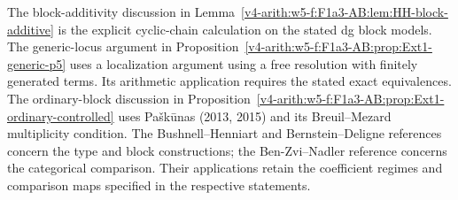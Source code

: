 The block-additivity discussion in
Lemma~\ref{v4-arith:w5-f:F1a3-AB:lem:HH-block-additive} is the
explicit cyclic-chain calculation on the stated dg block models. The generic-locus argument in
Proposition~\ref{v4-arith:w5-f:F1a3-AB:prop:Ext1-generic-p5} uses a localization argument using a free resolution with finitely generated terms.
Its arithmetic application requires the stated exact equivalences. The ordinary-block discussion in
Proposition~\ref{v4-arith:w5-f:F1a3-AB:prop:Ext1-ordinary-controlled}
uses Pa{\v s}k{\=u}nas (2013, 2015) and its Breuil--Mezard
multiplicity condition. The Bushnell--Henniart and Bernstein--Deligne
references concern the type and block constructions; the
Ben-Zvi--Nadler reference concerns the categorical comparison.
Their applications retain the coefficient regimes and comparison
maps specified in the respective statements.

